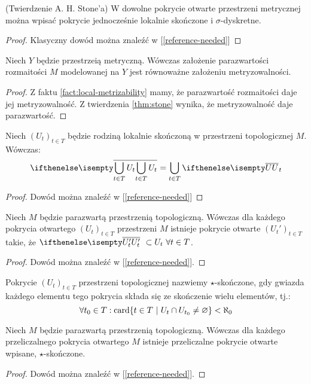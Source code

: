 \begin{thm}(Twierdzenie A. H. Stone'a)
  \label{thm:stone}
  W dowolne pokrycie otwarte przestrzeni metrycznej można wpisać pokrycie jednocześnie lokalnie skończone i $\sigma$-dyskretne.
  \begin{proof}
    Klasyczny dowód można znaleźć w [\ref{reference-needed}]
  \end{proof}
\end{thm}

\begin{cor}
  Niech $Y$ będzie przestrzeią metryczną. Wówczas założenie parazwartości rozmaitości $M$ modelowanej na $Y$ jest równoważne założeniu metryzowalności.
  \begin{proof}
    Z faktu \ref{fact:local-metrizability} mamy, że parazwartość rozmaitości daje jej metryzowalność. Z twierdzenia \ref{thm:stone} wynika, że metryzowalność daje parazwartość.
  \end{proof}
\end{cor}

\begin{lem} \label{lem:cl-locally-finite-sum}
  Niech $(U_t)_{t \in T}$ będzie rodziną lokalnie skończoną w przestrzeni topologicznej $M$. Wówczas:
  \[
    \cl{\bigcup_{t \in T} U_t} = \bigcup_{t \in T} \cl U_t
  \]
  \begin{proof}
    Dowód można znaleźć w [\ref{reference-needed}]
  \end{proof}
\end{lem}

\begin{lem} \label{lem:cl-refinement}
  Niech $M$ będzie parazwartą przestrzenią topologiczną. Wówczas dla każdego pokrycia otwartego $(U_t)_{t \in T}$ przestrzeni $M$ istnieje pokrycie otwarte $(U_t')_{t \in T}$ takie, że $\cl{U_t'}\ \subset U_t\ \forall t \in T$.
  \begin{proof}
    Dowód można znaleźć w [\ref{reference-needed}].
  \end{proof}
\end{lem}

\begin{df}
  Pokrycie $(U_t)_{t \in T}$ przestrzeni topologicznej nazwiemy $\star$-skończone, gdy gwiazda każdego elementu tego pokrycia składa się ze skończenie wielu elementów, tj.:
  \[
    \forall t_0 \in T: \operatorname{card}\{t \in T\ |\ U_t \cap U_{t_0} \neq \varnothing\} < \aleph_0
  \]
\end{df}

\begin{lem} \label{lem:star-finite}
  Niech $M$ będzie parazwartą przestrzenią topologiczną. Wówczas dla każdego przeliczalnego pokrycia otwartego $M$ istnieje przeliczalne pokrycie otwarte wpisane, $\star$-skończone.
  \begin{proof}
    Dowód można znaleźć w [\ref{reference-needed}].
  \end{proof}
\end{lem}

